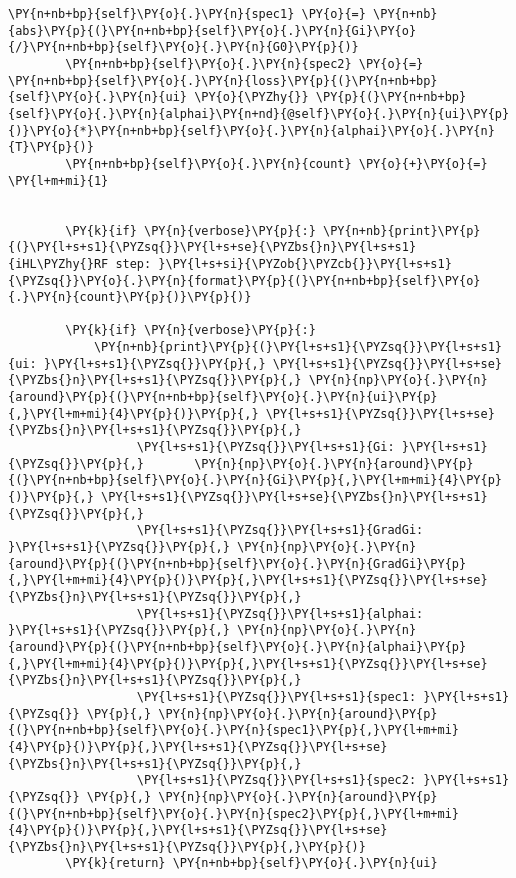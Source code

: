 \begin{tcolorbox}[breakable, size=fbox, boxrule=1pt, pad at break*=1mm,colback=cellbackground, colframe=cellborder]
\begin{Verbatim}[commandchars=\\\{\}]
        \PY{n+nb+bp}{self}\PY{o}{.}\PY{n}{spec1} \PY{o}{=} \PY{n+nb}{abs}\PY{p}{(}\PY{n+nb+bp}{self}\PY{o}{.}\PY{n}{Gi}\PY{o}{/}\PY{n+nb+bp}{self}\PY{o}{.}\PY{n}{G0}\PY{p}{)}
        \PY{n+nb+bp}{self}\PY{o}{.}\PY{n}{spec2} \PY{o}{=} \PY{n+nb+bp}{self}\PY{o}{.}\PY{n}{loss}\PY{p}{(}\PY{n+nb+bp}{self}\PY{o}{.}\PY{n}{ui} \PY{o}{\PYZhy{}} \PY{p}{(}\PY{n+nb+bp}{self}\PY{o}{.}\PY{n}{alphai}\PY{n+nd}{@self}\PY{o}{.}\PY{n}{ui}\PY{p}{)}\PY{o}{*}\PY{n+nb+bp}{self}\PY{o}{.}\PY{n}{alphai}\PY{o}{.}\PY{n}{T}\PY{p}{)}
        \PY{n+nb+bp}{self}\PY{o}{.}\PY{n}{count} \PY{o}{+}\PY{o}{=} \PY{l+m+mi}{1}


        \PY{k}{if} \PY{n}{verbose}\PY{p}{:} \PY{n+nb}{print}\PY{p}{(}\PY{l+s+s1}{\PYZsq{}}\PY{l+s+se}{\PYZbs{}n}\PY{l+s+s1}{iHL\PYZhy{}RF step: }\PY{l+s+si}{\PYZob{}\PYZcb{}}\PY{l+s+s1}{\PYZsq{}}\PY{o}{.}\PY{n}{format}\PY{p}{(}\PY{n+nb+bp}{self}\PY{o}{.}\PY{n}{count}\PY{p}{)}\PY{p}{)}

        \PY{k}{if} \PY{n}{verbose}\PY{p}{:}
            \PY{n+nb}{print}\PY{p}{(}\PY{l+s+s1}{\PYZsq{}}\PY{l+s+s1}{ui: }\PY{l+s+s1}{\PYZsq{}}\PY{p}{,} \PY{l+s+s1}{\PYZsq{}}\PY{l+s+se}{\PYZbs{}n}\PY{l+s+s1}{\PYZsq{}}\PY{p}{,} \PY{n}{np}\PY{o}{.}\PY{n}{around}\PY{p}{(}\PY{n+nb+bp}{self}\PY{o}{.}\PY{n}{ui}\PY{p}{,}\PY{l+m+mi}{4}\PY{p}{)}\PY{p}{,} \PY{l+s+s1}{\PYZsq{}}\PY{l+s+se}{\PYZbs{}n}\PY{l+s+s1}{\PYZsq{}}\PY{p}{,}
                  \PY{l+s+s1}{\PYZsq{}}\PY{l+s+s1}{Gi: }\PY{l+s+s1}{\PYZsq{}}\PY{p}{,}       \PY{n}{np}\PY{o}{.}\PY{n}{around}\PY{p}{(}\PY{n+nb+bp}{self}\PY{o}{.}\PY{n}{Gi}\PY{p}{,}\PY{l+m+mi}{4}\PY{p}{)}\PY{p}{,} \PY{l+s+s1}{\PYZsq{}}\PY{l+s+se}{\PYZbs{}n}\PY{l+s+s1}{\PYZsq{}}\PY{p}{,}
                  \PY{l+s+s1}{\PYZsq{}}\PY{l+s+s1}{GradGi: }\PY{l+s+s1}{\PYZsq{}}\PY{p}{,} \PY{n}{np}\PY{o}{.}\PY{n}{around}\PY{p}{(}\PY{n+nb+bp}{self}\PY{o}{.}\PY{n}{GradGi}\PY{p}{,}\PY{l+m+mi}{4}\PY{p}{)}\PY{p}{,}\PY{l+s+s1}{\PYZsq{}}\PY{l+s+se}{\PYZbs{}n}\PY{l+s+s1}{\PYZsq{}}\PY{p}{,}
                  \PY{l+s+s1}{\PYZsq{}}\PY{l+s+s1}{alphai: }\PY{l+s+s1}{\PYZsq{}}\PY{p}{,} \PY{n}{np}\PY{o}{.}\PY{n}{around}\PY{p}{(}\PY{n+nb+bp}{self}\PY{o}{.}\PY{n}{alphai}\PY{p}{,}\PY{l+m+mi}{4}\PY{p}{)}\PY{p}{,}\PY{l+s+s1}{\PYZsq{}}\PY{l+s+se}{\PYZbs{}n}\PY{l+s+s1}{\PYZsq{}}\PY{p}{,}
                  \PY{l+s+s1}{\PYZsq{}}\PY{l+s+s1}{spec1: }\PY{l+s+s1}{\PYZsq{}} \PY{p}{,} \PY{n}{np}\PY{o}{.}\PY{n}{around}\PY{p}{(}\PY{n+nb+bp}{self}\PY{o}{.}\PY{n}{spec1}\PY{p}{,}\PY{l+m+mi}{4}\PY{p}{)}\PY{p}{,}\PY{l+s+s1}{\PYZsq{}}\PY{l+s+se}{\PYZbs{}n}\PY{l+s+s1}{\PYZsq{}}\PY{p}{,}
                  \PY{l+s+s1}{\PYZsq{}}\PY{l+s+s1}{spec2: }\PY{l+s+s1}{\PYZsq{}} \PY{p}{,} \PY{n}{np}\PY{o}{.}\PY{n}{around}\PY{p}{(}\PY{n+nb+bp}{self}\PY{o}{.}\PY{n}{spec2}\PY{p}{,}\PY{l+m+mi}{4}\PY{p}{)}\PY{p}{,}\PY{l+s+s1}{\PYZsq{}}\PY{l+s+se}{\PYZbs{}n}\PY{l+s+s1}{\PYZsq{}}\PY{p}{,}\PY{p}{)}
        \PY{k}{return} \PY{n+nb+bp}{self}\PY{o}{.}\PY{n}{ui}
    

\end{Verbatim}
\end{tcolorbox}
